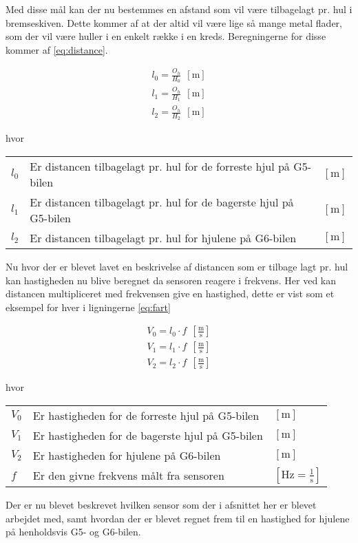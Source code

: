 \documentclass[12pt,a4paper]{report}
\begin{document}
Med disse mål kan der nu bestemmes en afstand som vil være tilbagelagt pr. hul i bremseskiven. Dette kommer af at der altid vil være lige så mange metal flader, som der vil være huller i en enkelt række i en kreds. Beregningerne for disse kommer af \ref{eq:distance}.

\begin{center}
	\begin{subequations} \label{eq:distance}
		\begin{align}
l_{0} = \frac{O_{h}}{H_{0}} ~~ \left[\text{m}\right] \\
l_{1} = \frac{O_{h}}{H_{1}} ~~ \left[\text{m}\right] \\
l_{2} = \frac{O_{h}}{H_{2}} ~~ \left[\text{m}\right]
		\end{align}	
	\end{subequations}
\end{center}
hvor
\begin{center}
	\begin{tabular}{ l l l }
	  $l_{0}$ & Er distancen tilbagelagt pr. hul for de forreste hjul på G5-bilen & $\left[\text{m}\right]$ \\
	  $l_{1}$ & Er distancen tilbagelagt pr. hul for de bagerste hjul på G5-bilen & $\left[\text{m}\right]$\\
	  $l_{2}$ & Er distancen tilbagelagt pr. hul for hjulene på G6-bilen & $\left[\text{m}\right]$ \\
	\end{tabular}  
\end{center}

Nu hvor der er blevet lavet en beskrivelse af distancen som er tilbage lagt pr. hul kan hastigheden nu blive beregnet da sensoren reagere i frekvens. Her ved kan distancen multipliceret med frekvensen give en hastighed, dette er vist som et eksempel for hver i ligningerne \ref{eq:fart}

\begin{center}
	\begin{subequations} \label{eq:fart}
		\begin{align}
V_{0} = l_{0} \cdot f ~~ \left[\frac{\text{m}}{\text{s}}\right] \\
V_{1} = l_{1} \cdot f ~~ \left[\frac{\text{m}}{\text{s}}\right] \\
V_{2} = l_{2} \cdot f ~~ \left[\frac{\text{m}}{\text{s}}\right]
		\end{align}	
	\end{subequations}
\end{center}
hvor
\begin{center}
	\begin{tabular}{ l l l }
	  $V_{0}$ & Er hastigheden for de forreste hjul på G5-bilen & $\left[\text{m}\right]$ \\
	  $V_{1}$ & Er hastigheden for de bagerste hjul på G5-bilen & $\left[\text{m}\right]$\\
	  $V_{2}$ & Er hastigheden for hjulene på G6-bilen & $\left[\text{m}\right]$ \\
	  $f$ & Er den givne frekvens målt fra sensoren & $\left[\text{Hz} = \frac{1}{\text{s}}\right]$ \\
	\end{tabular}  
\end{center}

Der er nu blevet beskrevet hvilken sensor som der i afsnittet her er blevet arbejdet med, samt hvordan der er blevet regnet frem til en hastighed for hjulene på henholdsvis G5- og G6-bilen.
\end{document}

